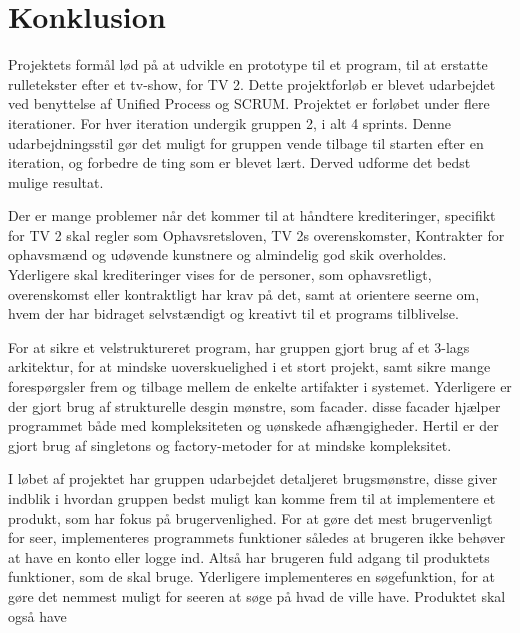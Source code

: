 \section{Konklusion}
Projektets formål lød på at udvikle en prototype til et program, til at erstatte rulletekster efter et tv-show, for TV 2.
Dette projektforløb er blevet udarbejdet ved benyttelse af Unified Process og SCRUM. Projektet er forløbet under flere iterationer. For hver iteration undergik gruppen 2, i alt 4 sprints. Denne udarbejdningsstil gør det muligt for gruppen vende tilbage til starten efter en iteration, og forbedre de ting som er blevet lært. Derved udforme det bedst mulige resultat.

Der er mange problemer når det kommer til at håndtere krediteringer, specifikt for TV 2 skal regler som Ophavsretsloven, TV 2s overenskomster, Kontrakter for ophavsmænd og udøvende kunstnere og almindelig god skik overholdes. Yderligere skal krediteringer vises for de personer, som ophavsretligt, overenskomst eller kontraktligt har krav på det, samt at orientere seerne om, hvem der har bidraget selvstændigt og kreativt til et programs tilblivelse.

For at sikre et velstruktureret program, har gruppen gjort brug af et 3-lags arkitektur, for at mindske uoverskuelighed i et stort projekt, samt sikre mange forespørgsler frem og tilbage mellem de enkelte artifakter i systemet. Yderligere er der gjort brug af strukturelle desgin mønstre, som facader. disse facader hjælper programmet både med kompleksiteten og uønskede afhængigheder. Hertil er der gjort brug af singletons og factory-metoder for at mindske kompleksitet.

I løbet af projektet har gruppen udarbejdet detaljeret brugsmønstre, disse giver indblik i hvordan gruppen bedst muligt kan komme frem til at implementere et produkt, som har fokus på brugervenlighed. For at gøre det mest brugervenligt for seer, implementeres programmets funktioner således at brugeren ikke behøver at have en konto eller logge ind. Altså har brugeren fuld adgang til produktets funktioner, som de skal bruge. Yderligere implementeres en søgefunktion, for at gøre det nemmest muligt for seeren at søge på hvad de ville have. Produktet skal også have 
